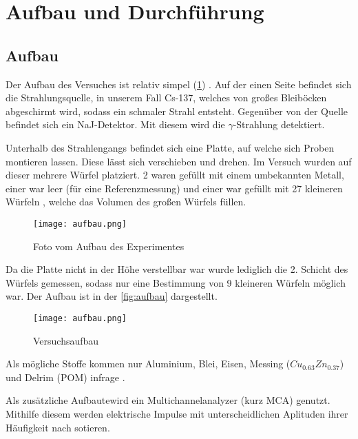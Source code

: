 \section{Aufbau und Durchführung}

\subsection{Aufbau}
Der Aufbau des Versuches ist relativ simpel (\ref{fig:1}) . Auf der einen Seite befindet sich die Strahlungsquelle, in unserem
Fall Cs-137, welches von großes Bleiböcken abgeschirmt wird, sodass ein schmaler Strahl entsteht. Gegenüber 
von der Quelle befindet sich ein NaJ-Detektor. Mit diesem wird die $\gamma$-Strahlung detektiert. 

\noindent
Unterhalb des Strahlengangs befindet sich eine Platte, auf welche sich Proben montieren lassen. Diese lässt 
sich verschieben und drehen. Im Versuch wurden auf dieser mehrere Würfel platziert. 2 waren gefüllt mit einem
umbekannten Metall, einer war leer (für eine Referenzmessung) und einer war gefüllt mit 27 kleineren Würfeln
, welche das Volumen des großen Würfels füllen.

\begin{figure}[H]
	\centering
	\texttt{[image: aufbau.png]}
	\caption{Foto vom Aufbau des Experimentes \cite{V14}}
	\label{fig:1}
\end{figure}

\noindent
Da die Platte nicht in der Höhe verstellbar war wurde lediglich die 2. Schicht des Würfels gemessen, sodass nur eine Bestimmung von 9 kleineren Würfeln möglich war. Der Aufbau ist
in der \autoref{fig:aufbau} dargestellt.

\begin{figure}
    \centering
    \texttt{[image: aufbau.png]}
    \caption{Versuchsaufbau \cite{V14}}
    \label{fig:aufbau}
  \end{figure}

\noindent
Als mögliche Stoffe kommen nur Aluminium, Blei, Eisen, Messing ($Cu_{0.63}Zn_{0.37}$) und Delrim (POM) infrage \cite{V14}. 

\noindent
Als zusätzliche Aufbautewird  ein Multichannelanalyzer (kurz MCA) genutzt. Mithilfe diesem werden elektrische Impulse mit unterscheidlichen Aplituden ihrer Häufigkeit nach sotieren. 

